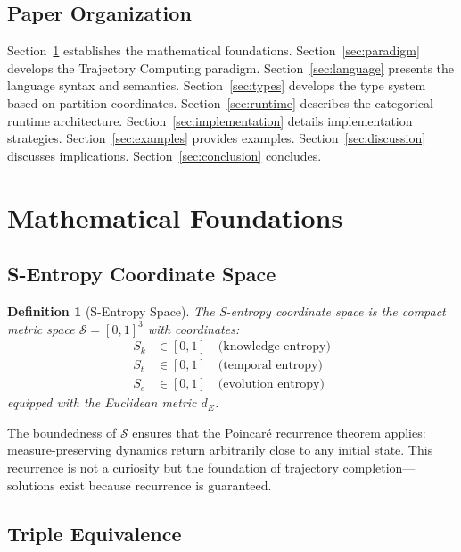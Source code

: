 \documentclass[twocolumn,10pt]{article}
\newtheorem{definition}[theorem]{Definition}
\theoremstyle{remark}
\newcommand{\Sk}{S_k}
\newcommand{\St}{S_t}
\newcommand{\Se}{S_e}
\newcommand{\Sspace}{\mathcal{S}}
\begin{document}
\subsection{Paper Organization}

Section~\ref{sec:foundation} establishes the mathematical foundations. Section~\ref{sec:paradigm} develops the Trajectory Computing paradigm. Section~\ref{sec:language} presents the language syntax and semantics. Section~\ref{sec:types} develops the type system based on partition coordinates. Section~\ref{sec:runtime} describes the categorical runtime architecture. Section~\ref{sec:implementation} details implementation strategies. Section~\ref{sec:examples} provides examples. Section~\ref{sec:discussion} discusses implications. Section~\ref{sec:conclusion} concludes.

\section{Mathematical Foundations}
\label{sec:foundation}

\subsection{S-Entropy Coordinate Space}

\begin{definition}[S-Entropy Space]
The S-entropy coordinate space is the compact metric space $\Sspace = [0,1]^3$ with coordinates:
\begin{align}
\Sk &\in [0,1] \quad \text{(knowledge entropy)} \\
\St &\in [0,1] \quad \text{(temporal entropy)} \\
\Se &\in [0,1] \quad \text{(evolution entropy)}
\end{align}
equipped with the Euclidean metric $d_E$.
\end{definition}

The boundedness of $\Sspace$ ensures that the Poincaré recurrence theorem applies: measure-preserving dynamics return arbitrarily close to any initial state. This recurrence is not a curiosity but the foundation of trajectory completion---solutions exist because recurrence is guaranteed.

\subsection{Triple Equivalence}
\end{document}
